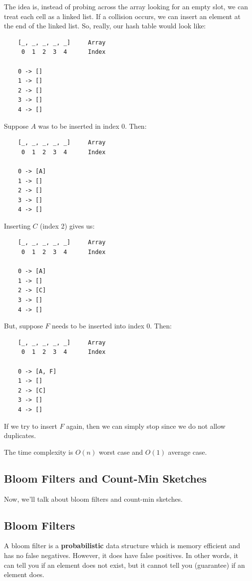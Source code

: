 \documentclass[letterpaper]{article}
\begin{document}
The idea is, instead of probing across the array looking for an empty slot, we can treat each cell as a linked list. If a collision occurs, we can insert an element at the end of the linked list. So, really, our hash table would look like: 
\begin{verbatim}
    [_, _, _, _, _]     Array 
     0  1  2  3  4      Index 

    0 -> []
    1 -> []
    2 -> []
    3 -> []
    4 -> []
\end{verbatim}
Suppose $A$ was to be inserted in index 0. Then: 
\begin{verbatim}
    [_, _, _, _, _]     Array 
     0  1  2  3  4      Index 

    0 -> [A]
    1 -> []
    2 -> []
    3 -> []
    4 -> []
\end{verbatim}
Inserting $C$ (index 2) gives us: 
\begin{verbatim}
    [_, _, _, _, _]     Array 
     0  1  2  3  4      Index 

    0 -> [A]
    1 -> []
    2 -> [C]
    3 -> []
    4 -> []
\end{verbatim}
But, suppose $F$ needs to be inserted into index 0. Then: 
\begin{verbatim}
    [_, _, _, _, _]     Array 
     0  1  2  3  4      Index 

    0 -> [A, F]
    1 -> []
    2 -> [C]
    3 -> []
    4 -> []
\end{verbatim}
If we try to insert $F$ again, then we can simply stop since we do not allow duplicates. 

\bigskip

The time complexity is $O(n)$ worst case and $O(1)$ average case. 


\subsection{Bloom Filters and Count-Min Sketches}
Now, we'll talk about bloom filters and count-min sketches. 

\subsection{Bloom Filters}
A bloom filter is a \textbf{probabilistic} data structure which is memory efficient and has no false negatives. However, it does have false positives. In other words, it can tell you if an element does not exist, but it cannot tell you (guarantee) if an element does. 

\bigskip
\end{document}
